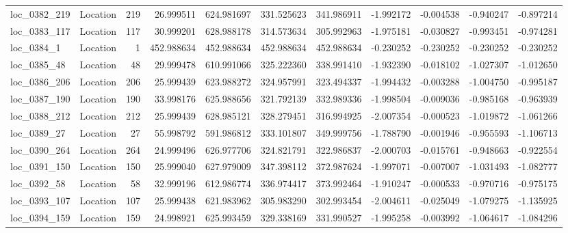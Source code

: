 \begin{tabular}{llrrrrrrrrr}
 loc_0382_219 &        Location &             219 &  26.999511 & 624.981697 &  331.525623 &    341.986911 &  -1.992172 &  -0.004538 &   -0.940247 &     -0.897214 \\
 loc_0383_117 &        Location &             117 &  30.999201 & 628.988178 &  314.573634 &    305.992963 &  -1.975181 &  -0.030827 &   -0.993451 &     -0.974281 \\
   loc_0384_1 &        Location &               1 & 452.988634 & 452.988634 &  452.988634 &    452.988634 &  -0.230252 &  -0.230252 &   -0.230252 &     -0.230252 \\
  loc_0385_48 &        Location &              48 &  29.999478 & 610.991066 &  325.222360 &    338.991410 &  -1.932390 &  -0.018102 &   -1.027307 &     -1.012650 \\
 loc_0386_206 &        Location &             206 &  25.999439 & 623.988272 &  324.957991 &    323.494337 &  -1.994432 &  -0.003288 &   -1.004750 &     -0.995187 \\
 loc_0387_190 &        Location &             190 &  33.998176 & 625.988656 &  321.792139 &    332.989336 &  -1.998504 &  -0.009036 &   -0.985168 &     -0.963939 \\
 loc_0388_212 &        Location &             212 &  25.999439 & 628.985121 &  328.279451 &    316.994925 &  -2.007354 &  -0.000523 &   -1.019872 &     -1.061266 \\
  loc_0389_27 &        Location &              27 &  55.998792 & 591.986812 &  333.101807 &    349.999756 &  -1.788790 &  -0.001946 &   -0.955593 &     -1.106713 \\
 loc_0390_264 &        Location &             264 &  24.999496 & 626.977706 &  324.821791 &    322.986837 &  -2.000703 &  -0.015761 &   -0.948663 &     -0.922554 \\
 loc_0391_150 &        Location &             150 &  25.999040 & 627.979009 &  347.398112 &    372.987624 &  -1.997071 &  -0.007007 &   -1.031493 &     -1.082777 \\
  loc_0392_58 &        Location &              58 &  32.999196 & 612.986774 &  336.974417 &    373.992464 &  -1.910247 &  -0.000533 &   -0.970716 &     -0.975175 \\
 loc_0393_107 &        Location &             107 &  25.999438 & 621.983962 &  305.983290 &    302.993454 &  -2.004611 &  -0.025049 &   -1.079275 &     -1.135925 \\
 loc_0394_159 &        Location &             159 &  24.998921 & 625.993459 &  329.338169 &    331.990527 &  -1.995258 &  -0.003992 &   -1.064617 &     -1.084296 \\

\end{tabular}
